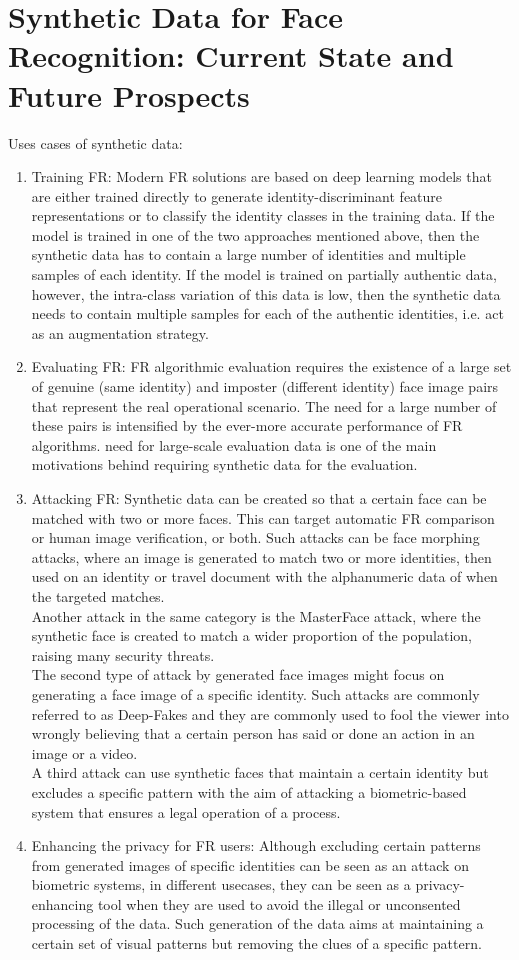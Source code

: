 \documentclass[12pt]{article}
\begin{document}
\section{Synthetic Data for Face Recognition: Current State and Future
Prospects
}
Uses cases of synthetic data:
\begin{enumerate}
  \item Training FR: Modern FR solutions are based
  on deep learning models that are either trained
  directly to generate identity-discriminant feature
  representations or to classify the identity classes in the training data. If the model is trained in
  one of the two approaches mentioned above, then
  the synthetic data has to contain a large number
  of identities and multiple samples of each identity. If the model is trained on partially authentic data, however, the intra-class variation of this
  data is low, then the synthetic data needs to contain multiple samples for each of the authentic
  identities, i.e. act as an augmentation strategy.
  \item Evaluating FR: FR algorithmic evaluation requires the existence of a large set of genuine
  (same identity) and imposter (different identity)
  face image pairs that represent the real operational scenario. The need for a large number
  of these pairs is intensified by the ever-more
  accurate performance of FR algorithms. need for
  large-scale evaluation data is one of the main motivations behind requiring synthetic data for the
  evaluation.
  \item Attacking FR: Synthetic
  data can be created so that a certain face can
  be matched with two or more faces. This can
  target automatic FR comparison or human image verification, or both. Such attacks can be
  face morphing attacks, where an image is generated to match two or more identities, then used
  on an identity or travel document with the alphanumeric data of when the targeted matches.\\
  Another attack in the same category is the MasterFace attack, where the synthetic face is created to match a wider proportion
of the population, raising many security threats.\\
The second type of attack by generated face images might focus on generating a face image of a
specific identity. Such attacks are commonly referred to as Deep-Fakes and they are commonly
used to fool the viewer into wrongly believing
that a certain person has said or done an action
in an image or a video.\\
A third attack can use
synthetic faces that maintain a certain identity
but excludes a specific pattern with the aim of
attacking a biometric-based system that ensures
a legal operation of a process. 
  \item Enhancing the privacy for FR users: Although excluding certain patterns from generated images of specific identities can be seen as
  an attack on biometric systems, in different usecases, they can be seen as a privacy-enhancing
  tool when they are used to avoid the illegal or
  unconsented processing of the data. Such generation of the data aims at maintaining a certain
  set of visual patterns but removing the clues of a
  specific pattern.
\end{enumerate}
\end{document}

